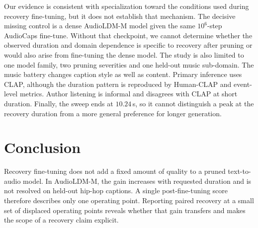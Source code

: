 Our evidence is consistent with specialization toward the conditions used during recovery fine-tuning, but it does not establish that mechanism. The decisive missing control is a dense AudioLDM-M model given the same $10^{6}$-step AudioCaps fine-tune. Without that checkpoint, we cannot determine whether the observed duration and domain dependence is specific to recovery after pruning or would also arise from fine-tuning the dense model. The study is also limited to one model family, two pruning severities and one held-out music sub-domain. The music battery changes caption style as well as content. Primary inference uses CLAP, although the duration pattern is reproduced by Human-CLAP and event-level metrics. Author listening is informal and disagrees with CLAP at short duration. Finally, the sweep ends at $10.24$\,s, so it cannot distinguish a peak at the recovery duration from a more general preference for longer generation.

\section{Conclusion}
Recovery fine-tuning does not add a fixed amount of quality to a pruned text-to-audio model. In AudioLDM-M, the gain increases with requested duration and is not resolved on held-out hip-hop captions. A single post-fine-tuning score therefore describes only one operating point. Reporting paired recovery at a small set of displaced operating points reveals whether that gain transfers and makes the scope of a recovery claim explicit.

